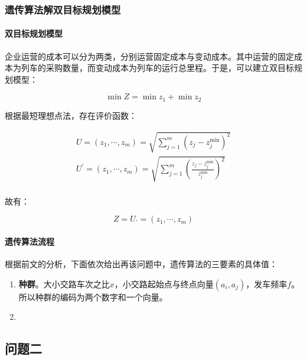\subsubsection{遗传算法解双目标规划模型}

\paragraph{双目标规划模型}

企业运营的成本可以分为两类，分别运营固定成本与变动成本。其中运营的固定成本为列车的采购数量，而变动成本为列车的运行总里程。于是，可以建立双目标规划模型\cite{caoJiyuchengkedengdaishijiandechengshiguidaojiaotongliecheshikebiaoyouhuamoxingyusuanfayanjiu2021}：

\begin{equation}
    \min Z = \min z_1 + \min z_2
\end{equation}

根据最短理想点法，存在评价函数：

\begin{align}
    U = (z_1, \cdots, z_m) = \sqrt{\sum_{j=1}^m(z_j-z_j^{\min})^2}  \\
    U^{'} = (z_1, \cdots, z_m) = \sqrt{
        \sum_{j=1}^m (
                \frac{z_j-z_j^{\min}}{z_j^{\min}}
            )^2
        }   \\
\end{align}

故有：

\begin{equation}
    Z = U_{'}=(z_1,\cdots,z_m)
\end{equation}

\paragraph{遗传算法流程}

根据前文的分析，下面依次给出再该问题中，遗传算法的三要素的具体值：

\begin{enumerate}
    \item \textbf{种群}。大小交路车次之比$x$，小交路起始点与终点向量$(a_i, a_j)$，发车频率$f$。所以种群的编码为两个数字和一个向量。
    \item 
\end{enumerate}



\subsection{问题二}

